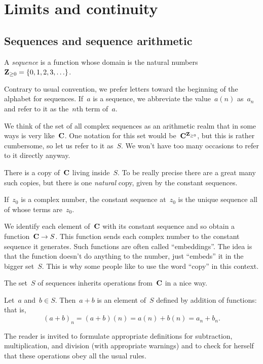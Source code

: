 \documentclass[twocolumn,12pt]{article}
\begin{document}
\section{Limits and continuity}
\subsection{Sequences and sequence arithmetic}
\begin{definition}
  A \emph{sequence} is a function whose domain is the natural numbers~$\mathbf{Z}_{\geq 0} = \{0, 1, 2, 3, \ldots\}$.
\end{definition}
Contrary to usual convention, we prefer letters toward the beginning of the alphabet for sequences. If~$a$ is a sequence, we abbreviate the value~$a(n)$ as~$a_n$ and refer to it as the~$n$th term of~$a$.

We think of the set of all complex sequences as an arithmetic realm that in some ways is very like~$\mathbf{C}$. One notation for this set would be~$\mathbf{C}^{\mathbf{Z}_{\geq 0}}$, but this is rather cumbersome, so let us refer to it as~$S$. We won't have too many occasions to refer to it directly anyway. 

There is a copy of~$\mathbf{C}$ living inside~$S$. To be really precise there are a great many such copies, but there is one \emph{natural} copy, given by the constant sequences.
\begin{definition}
  If~$z_0$ is a complex number, the constant sequence at~$z_0$ is the unique sequence all of whose terms are~$z_0$.
\end{definition}
We identify each element of~$\mathbf{C}$ with its constant sequence and so obtain a function~$\mathbf{C} \to S$. This function sends each complex number to the constant sequence it generates. Such functions are often called ``embeddings''. The idea is that the function doesn't do anything to the number, just ``embeds'' it in the bigger set~$S$. This is why some people like to use the word ``copy'' in this context.

The set~$S$ of sequences inherits operations from~$\mathbf{C}$ in a nice way. 
\begin{definition}
  Let~$a$ and~$b \in S$. Then~$a + b$ is an element of~$S$ defined by addition of functions: that is,
  \[
    (a + b)_n = (a + b)(n) = a(n) + b(n) = a_n + b_n.
  \]
\end{definition}
The reader is invited to formulate appropriate definitions for subtraction, multiplication, and division (with appropriate warnings) and to check for herself that these operations obey all the usual rules.
\end{document}

